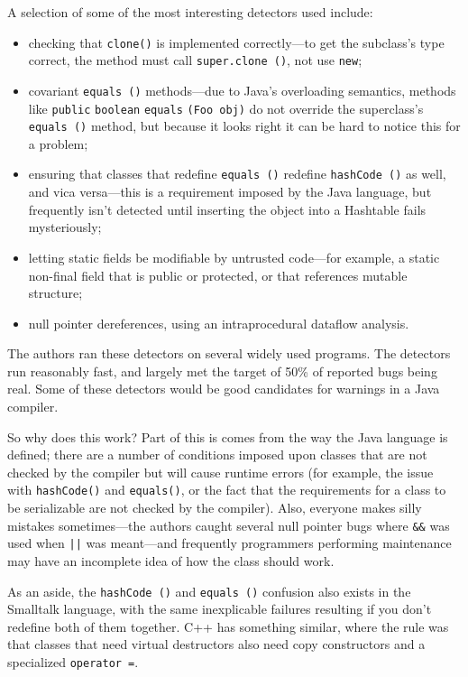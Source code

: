 \documentclass{article}
\begin{document}
\begin{multicols}{2}
A selection of some of the most interesting detectors used include:
\begin{itemize}
\item checking that \texttt{clone()} is implemented correctly---to get
  the subclass's type correct, the method must call
  \texttt{super.clone ()}, not use \texttt{new};
\item covariant \texttt{equals ()} methods---due to Java's overloading
  semantics, methods like \texttt{public} \texttt{boolean}
  \texttt{equals} \texttt{(Foo obj)} do not override the superclass's
  \texttt{equals ()} method, but because it looks right it can be hard
  to notice this for a problem;
\item ensuring that classes that redefine \texttt{equals ()} redefine
  \texttt{hashCode ()} as well, and vica versa---this is a requirement
  imposed by the Java language, but frequently isn't detected until
  inserting the object into a Hashtable fails mysteriously;
\item letting static fields be modifiable by untrusted code---for
  example, a static non-final field that is public or protected, or
  that references mutable structure;
\item null pointer dereferences, using an intraprocedural dataflow
  analysis.
\end{itemize}

The authors ran these detectors on several widely used programs.  The
detectors run reasonably fast, and largely met the target of 50\% of
reported bugs being real.  Some of these detectors would be good
candidates for warnings in a Java compiler.

So why does this work?  Part of this is comes from the way the Java
language is defined; there are a number of conditions imposed upon
classes that are not checked by the compiler but will cause runtime
errors (for example, the issue with \texttt{hashCode()} and
\texttt{equals()}, or the fact that the requirements for a class to be
serializable are not checked by the compiler).  Also, everyone makes
silly mistakes sometimes---the authors caught several null pointer
bugs where \verb/&&/ was used when \verb/||/ was meant---and
frequently programmers performing maintenance may have an incomplete
idea of how the class should work.

As an aside, the \texttt{hashCode ()} and \texttt{equals ()} confusion
also exists in the Smalltalk language, with the same inexplicable
failures resulting if you don't redefine both of them together.  C++
has something similar, where the rule was that classes that need
virtual destructors also need copy constructors and a specialized
\texttt{operator =}.


\end{multicols}
\end{document}
